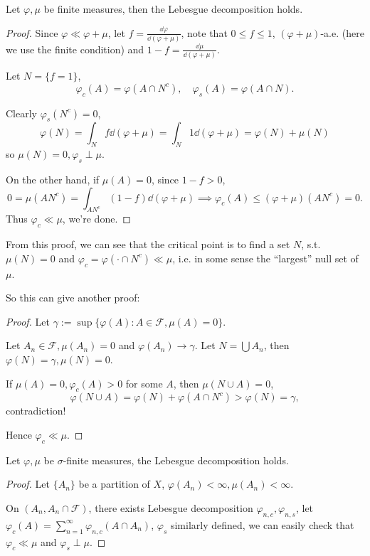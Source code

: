 \begin{proposition}
	Let $\varphi, \mu$ be finite measures, then the Lebesgue decomposition holds.
\end{proposition}
\begin{proof}[Proof]
    Since $\varphi \ll \varphi + \mu$, let $f = \frac{\dd\varphi}{\dd(\varphi+\mu)}$,
	note that $0\le f\le 1$, $(\varphi+\mu)$-a.e. (here we use the finite condition)
	and $1 - f  = \frac{\dd\mu}{\dd(\varphi+\mu)}$.

	Let $N = \{f = 1\}$,
	\[
		\varphi_c(A) = \varphi(A\cap N^c),\quad \varphi_s(A) = \varphi(A\cap N).
	\]

	Clearly $\varphi_s(N^c) = 0$,
	\[
	\varphi(N) = \int_N f\dd(\varphi+\mu) = \int_N 1 \dd(\varphi+\mu)
	= \varphi(N) + \mu(N)
	\]
	so $\mu(N) = 0, \varphi_s \perp \mu$.

	On the other hand, if $\mu(A) = 0$, since $1 - f > 0$,
	\[
	0 = \mu(AN^c) = \int_{AN^c}(1-f)\dd(\varphi+\mu) \implies
	\varphi_c(A) \le (\varphi + \mu)(AN^c) = 0.
	\]
	Thus $\varphi_c \ll \mu$, we're done.
\end{proof}

From this proof, we can see that the critical point is to find a set $N$,
s.t. $\mu(N) = 0$ and $\varphi_c = \varphi(\cdot \cap N^c) \ll \mu$,
i.e. in some sense the ``largest'' null set of $\mu$.

So this can give another proof:
\begin{proof}[Proof]
    Let $\gamma := \sup\{\varphi(A): A\in \mathscr{F}, \mu(A) = 0\}$.

	Let $A_n \in \mathscr{F}, \mu(A_n) = 0$ and $\varphi(A_n) \to \gamma$.
	Let $N = \bigcup A_n$, then $\varphi(N) = \gamma, \mu(N) = 0$.

	If $\mu(A) = 0, \varphi_c(A) > 0$ for some $A$, then $\mu(N\cup A) = 0$,
	\[
	\varphi(N\cup A) = \varphi(N) + \varphi(A\cap N^c) > \varphi(N) = \gamma,
	\]
	contradiction!

	Hence $\varphi_c \ll \mu$.
\end{proof}

\begin{proposition}
	Let $\varphi, \mu$ be $\sigma$-finite measures, the Lebesgue decomposition holds.
\end{proposition}
\begin{proof}[Proof]
    Let $\{A_n\}$ be a partition of $X$, $\varphi(A_n) < \infty, \mu(A_n) < \infty$.

	On $(A_n ,A_n\cap \mathscr{F})$, there exists Lebesgue
	decomposition $\varphi_{n,c}, \varphi_{n,s}$,
	let $\varphi_c(A) = \sum_{n=1}^{\infty} \varphi_{n,c}(A\cap A_n)$,
	$\varphi_s$ similarly defined,
	we can easily check that $\varphi_c \ll \mu$ and $\varphi_s \perp \mu$.
\end{proof}

